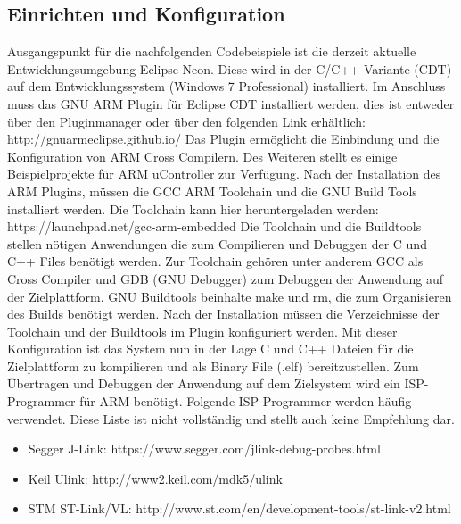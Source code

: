 \pagebreak
\subsection{Einrichten und Konfiguration}
\label{sec:Einrichtung und Konfiguration}
Ausgangspunkt für die nachfolgenden Codebeispiele ist die derzeit aktuelle Entwicklungsumgebung Eclipse Neon. Diese wird in der C/C++ Variante (CDT) auf dem Entwicklungssystem (Windows 7 Professional) installiert. Im Anschluss muss das GNU ARM Plugin für Eclipse CDT installiert werden, dies ist entweder über den Pluginmanager oder über den folgenden Link erhältlich: 
\newline
\newline
http://gnuarmeclipse.github.io/
\newline
\newline
Das Plugin ermöglicht die Einbindung und die Konfiguration von ARM Cross Compilern. Des Weiteren stellt es einige Beispielprojekte für ARM uController zur Verfügung. Nach der Installation des ARM Plugins, müssen die GCC ARM Toolchain und die GNU Build Tools installiert werden. 
Die Toolchain kann hier heruntergeladen werden: 
\newline
\newline
https://launchpad.net/gcc-arm-embedded
\newline
\newline
Die Toolchain und die Buildtools stellen nötigen Anwendungen die zum Compilieren und Debuggen der C und C++ Files benötigt werden. Zur Toolchain gehören unter anderem GCC als Cross Compiler und GDB (GNU Debugger) zum Debuggen der Anwendung auf der Zielplattform. GNU Buildtools beinhalte make und rm, die zum Organisieren des Builds benötigt werden. Nach der Installation müssen die Verzeichnisse der Toolchain und der Buildtools im Plugin konfiguriert werden. Mit dieser Konfiguration ist das System nun in der Lage C und C++ Dateien für die Zielplattform zu kompilieren und als Binary File (.elf) bereitzustellen. Zum Übertragen und Debuggen der Anwendung auf dem Zielsystem wird ein ISP-Programmer für ARM benötigt. Folgende ISP-Programmer werden häufig verwendet. Diese Liste ist nicht vollständig und stellt auch keine Empfehlung dar. 
\begin{itemize}
	\item Segger J-Link:
	\newline
	https://www.segger.com/jlink-debug-probes.html
	\item Keil Ulink: 
	\newline
	http://www2.keil.com/mdk5/ulink
	\item STM ST-Link/VL: 
	\newline
	http://www.st.com/en/development-tools/st-link-v2.html
\end{itemize}
